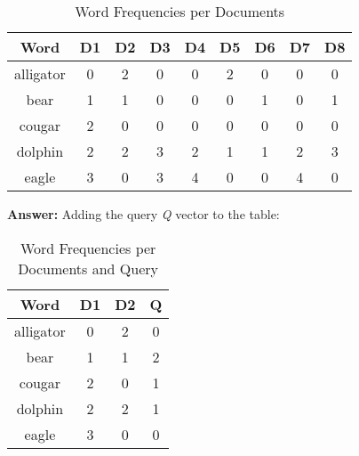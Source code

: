 \documentclass[11pt]{article}
\begin{document}
\begin{enumerate}
        \begin{table}[htbp]
            \begin{center}
                \caption{Word Frequencies per Documents}
                \begin{tabular}{| c | c | c | c | c | c | c | c | c |}
                \hline
                \textbf{Word} & \textbf{D1} & \textbf{D2} & D3 & D4 & D5 & D6 & D7 & D8  \\
                \hline
                alligator   & 0 & 2 & 0 & 0 & 2 & 0 & 0 & 0 \\
                \hline
                bear        & 1 & 1 & 0 & 0 & 0 & 1 & 0 & 1 \\
                \hline
                cougar      & 2 & 0 & 0 & 0 & 0 & 0 & 0 & 0 \\
                \hline
                dolphin     & 2 & 2 & 3 & 2 & 1 & 1 & 2 & 3 \\
                \hline
                eagle       & 3 & 0 & 3 & 4 & 0 & 0 & 4 & 0 \\
                \hline
                \end{tabular}
            \end{center}
        \end{table}
        \clearpage
        \newpage

        \textbf{Answer:} Adding the query \textit{Q} vector to the table:
        \begin{table}[htbp]
            \begin{center}
                \caption{Word Frequencies per Documents and Query}
                \begin{tabular}{| c | c | c | c |}
                \hline
                \textbf{Word} & \textbf{D1} & \textbf{D2} & Q  \\
                \hline
                alligator   & 0 & 2 & 0 \\
                \hline
                bear        & 1 & 1 & 2 \\
                \hline
                cougar      & 2 & 0 & 1 \\
                \hline
                dolphin     & 2 & 2 & 1 \\
                \hline
                eagle       & 3 & 0 & 0 \\
                \hline
                \end{tabular}
            \end{center}
        \end{table}


\end{enumerate}
\end{document}
